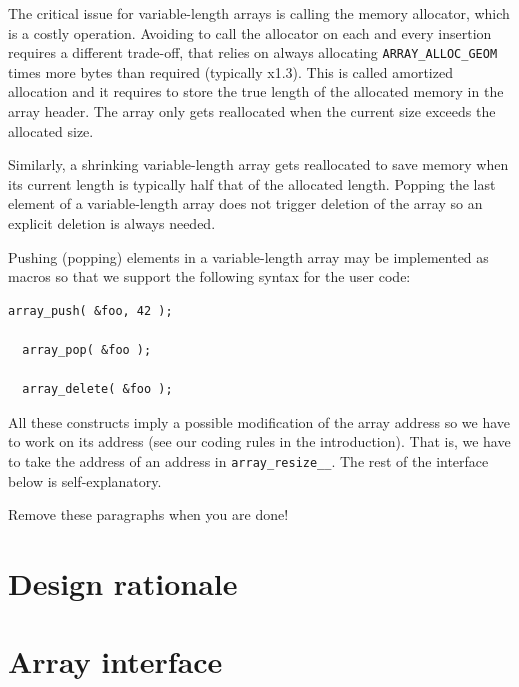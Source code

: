 The critical issue for variable-length arrays is calling the memory allocator, which is a costly operation. Avoiding to call the allocator on each and every insertion requires a different trade-off, that relies on always allocating \texttt{ARRAY\_ALLOC\_GEOM} times more bytes than required (typically x1.3). This is called amortized allocation and it requires to store the true length of the allocated memory in the array header. The array only gets reallocated when the current size exceeds the allocated size.

Similarly, a shrinking variable-length array gets reallocated to save memory when its current length is typically half that of the allocated length. Popping the last element of a variable-length array does not trigger deletion of the array so an explicit deletion is always needed. 

Pushing (popping) elements in a variable-length array may be implemented as macros so that we support the following syntax for the user code:

\begin{lstlisting}[style=C]
  array_push( &foo, 42 );

  array_pop( &foo );

  array_delete( &foo );
\end{lstlisting}

All these constructs imply a possible modification of the array address so we have to work on its address (see our coding rules in the introduction). That is, we have to take the address of an address in \texttt{array\_resize\_\_}. The rest of the interface below is self-explanatory. 

Remove these paragraphs when you are done!

\section{Design rationale}

\section{Array interface}\label{arrays:interface}

\begin{code}
  
  \caption{Interface for (possibly variable-length) arrays.}
\end{code}
